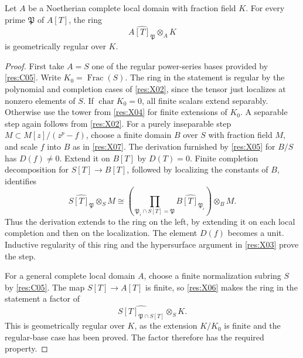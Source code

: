 \begin{lemma}\label{res:X12}
Let \(A\) be a Noetherian complete local domain with fraction field \(K\). For every prime \(\mathfrak P\) of \(A[T]\), the ring
\[
                 \widehat{A[T]_{\mathfrak P}}\otimes_A K
\]
is geometrically regular over \(K\).
\end{lemma}
\begin{proof}
First take \(A=S\) one of the regular power-series bases provided by \ref{res:C05}. Write \(K_0=\operatorname{Frac}(S)\). The ring in the statement is regular by the polynomial and completion cases of \ref{res:X02}, since the tensor just localizes at nonzero elements of \(S\). If \(\operatorname{char}K_0=0\), all finite scalars extend separably. Otherwise use the tower from \ref{res:X04} for finite extensions of \(K_0\). A separable step again follows from \ref{res:X02}. For a purely inseparable step \(M\subset M[z]/(z^p-f)\), choose a finite domain \(B\) over \(S\) with fraction field \(M\), and scale \(f\) into \(B\) as in \ref{res:X07}. The derivation furnished by \ref{res:X05} for \(B/S\) has \(D(f)\ne0\). Extend it on \(B[T]\) by \(D(T)=0\). Finite completion decomposition for \(S[T]\to B[T]\), followed by localizing the constants of \(B\), identifies
\[
 \widehat{S[T]_{\mathfrak P}}\otimes_S M
   \cong
 \left(\prod_{\mathfrak P_i\cap S[T]=\mathfrak P}
                \widehat{B[T]_{\mathfrak P_i}}\right)\otimes_B M .
\]
Thus the derivation extends to the ring on the left, by extending it on each local completion and then on the localization. The element \(D(f)\) becomes a unit. Inductive regularity of this ring and the hypersurface argument in \ref{res:X03} prove the step.

For a general complete local domain \(A\), choose a finite normalization subring \(S\) by \ref{res:C05}. The map \(S[T]\to A[T]\) is finite, so \ref{res:X06} makes the ring in the statement a factor of
\[
         \widehat{S[T]_{\mathfrak P\cap S[T]}}\otimes_S K .
\]
This is geometrically regular over \(K\), as the extension \(K/K_0\) is finite and the regular-base case has been proved. The factor therefore has the required property.
\end{proof}

